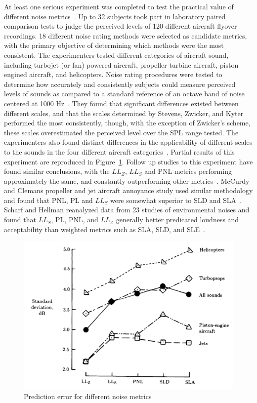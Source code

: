 \documentclass[]{aiaa-tc}%
\begin{document}
At least one serious experiment was completed to test the practical value of different noise metrics~\cite{ollerhead1971evaluation}. Up to 32 subjects took part in laboratory paired comparison tests to judge the perceived levels of 120 different aircraft flyover recordings. 18 different noise rating methods were selected as candidate metrics, with the primary objective of determining which methods were the most consistent. The experimenters tested different categories of aircraft sound, including turbojet (or fan) powered aircraft, propeller turbine aircraft, piston engined aircraft, and helicopters. Noise rating procedures were tested to determine how accurately and consistently subjects could measure perceived levels of sounds as compared to a standard reference of an octave band of noise centered at 1000 Hz~\cite{ollerhead1971evaluation}. They found that significant differences existed between different scales, and that the scales determined by Stevens, Zwicker, and Kyter performed the most consistently, though, with the exception of Zwicker's scheme, these scales overestimated the perceived level over the SPL range tested. The experimenters also found distinct differences in the applicability of different scales to the sounds in the four different aircraft categories~\cite{ollerhead1971evaluation}. Partial results of this experiment are reproduced in Figure~\ref{fig:noise-metrics}. Follow up studies to this experiment have found similar conclusions, with the $LL_Z$, $LL_S$ and PNL metrics performing approximately the same, and constantly outperforming other metrics~\cite{mccurdy1982annoyance, scharf1979comparison, powell1991human}. McCurdy and Clemans propeller and jet aircraft annoyance study used similar methodology and found that PNL, PL and $LL_S$ were somewhat superior to SLD and SLA~\cite{mccurdy1982annoyance}. Scharf and Hellman reanalyzed data from 23 studies of environmental noises and found that $LL_S$, PL, PNL, and $LL_Z$ generally better predicated loudness and acceptability than weighted metrics such as SLA, SLD, and SLE~\cite{scharf1979comparison}.

\begin{figure}[tb!]
  \centering
  \includegraphics[width=\textwidth]{figs/noise-metrics.png}
  \caption{Prediction error for different noise metrics~\cite{ollerhead1971evaluation}}
  \label{fig:noise-metrics}
\end{figure}
\end{document}
